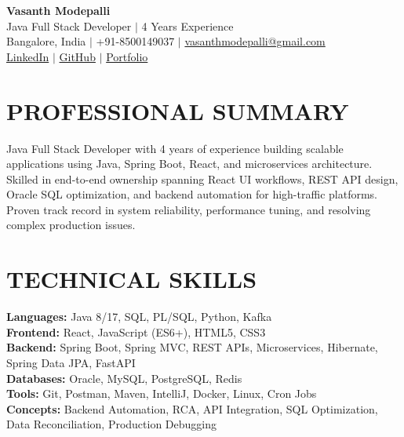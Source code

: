 \documentclass[a4paper,10pt]{article}
\begin{document}
\begin{center}
    {\Huge \textbf{Vasanth Modepalli}} \\ \vspace{2pt}
    Java Full Stack Developer $|$ 4 Years Experience \\ \vspace{1pt}
    Bangalore, India $|$ +91-8500149037 $|$ \href{mailto:vasanthmodepalli@gmail.com}{vasanthmodepalli@gmail.com} \\ \vspace{2pt}
    \href{https://linkedin.com/in/}{LinkedIn} $|$ \href{https://github.com/}{GitHub} $|$ \href{https://portfolio.com/}{Portfolio}
\end{center}

\section*{PROFESSIONAL SUMMARY}
Java Full Stack Developer with 4 years of experience building scalable applications using Java, Spring Boot, React, and microservices architecture. Skilled in end-to-end ownership spanning React UI workflows, REST API design, Oracle SQL optimization, and backend automation for high-traffic platforms. Proven track record in system reliability, performance tuning, and resolving complex production issues.

\section*{TECHNICAL SKILLS}
\textbf{Languages:} Java 8/17, SQL, PL/SQL, Python, Kafka \\
\textbf{Frontend:} React, JavaScript (ES6+), HTML5, CSS3 \\
\textbf{Backend:} Spring Boot, Spring MVC, REST APIs, Microservices, Hibernate, Spring Data JPA, FastAPI \\
\textbf{Databases:} Oracle, MySQL, PostgreSQL, Redis \\
\textbf{Tools:} Git, Postman, Maven, IntelliJ, Docker, Linux, Cron Jobs \\
\textbf{Concepts:} Backend Automation, RCA, API Integration, SQL Optimization, Data Reconciliation, Production Debugging
\end{document}
